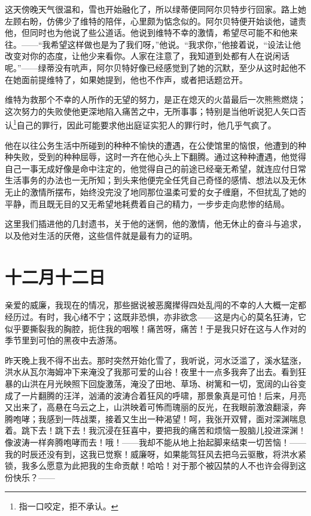 \documentclass[12pt,oneside]{book}
\begin{document}
\begin{framed}
这天傍晚天气很温和，雪也开始融化了，所以绿蒂便同阿尔贝特步行回家。路上她左顾右盼，仿佛少了维特的陪伴，心里颇为惦念似的。阿尔贝特便开始谈他，谴责他，但同时也为他说了些公道话。他说到维特不幸的激情，希望尽可能不和他来往。——“我希望这样做也是为了我们呀，”他说。“我求你，”他接着说，“设法让他改变对你的态度，让他少来看你。人家在注意了，我知道到处都有人在说闲话呢。”——绿蒂没有吭声，阿尔贝特好像已经感觉到了她的沉默，至少从这时起他不在她面前提维特了，如果她提到，他也不作声，或者把话题岔开。

维特为救那个不幸的人所作的无望的努力，是正在熄灭的火苗最后一次熊熊燃烧；这次努力的失败使他更深地陷入痛苦之中，无所事事；特别是当他听说犯人矢口否认\footnote{指一口咬定，拒不承认。}自己的罪行，因此可能要求他出庭证实犯人的罪行时，他几乎气疯了。

他在以往公务生活中所碰到的种种不愉快的遭遇，在公使馆里的恼恨，他遭到的种种失败，受到的种种屈辱，这时一齐在他心头上下翻腾。通过这种种遭遇，他觉得自己一事无成好像是命中注定的，他觉得自己的前途已经毫无希望，就连应付日常生活事务的办法也一无所知；到头来他便完全任凭自己奇怪的感情、想法以及无休无止的激情所摆布，始终没完没了地同那位温柔可爱的女子缠磨，不但扰乱了她的平静，而且既无目的又无希望地耗费着自己的精力，一步步走向悲惨的结局。

这里我们插进他的几封遗书，关于他的迷惘，他的激情，他无休止的奋斗与追求，以及他对生活的厌倦，这些信件就是最有力的证明。
　　
\end{framed}



\chapter{十二月十二日}
亲爱的威廉，我现在的情况，那些据说被恶魔撵得四处乱闯的不幸的人大概一定都经历过。有时，我心绪不宁；这既非恐惧，亦非欲念——这是内心的莫名狂涛，它似乎要撕裂我的胸腔，扼住我的咽喉！痛苦呀，痛苦！于是我只好在这与人作对的季节里到可怕的黑夜中去游荡。

昨天晚上我不得不出去。那时突然开始化雪了，我听说，河水泛滥了，溪水猛涨，洪水从瓦尔海姆冲下来淹没了我那可爱的山谷！夜里十一点多我奔了出去。看到狂暴的山洪在月光映照下回旋激荡，淹没了田地、草场、树篱和一切，宽阔的山谷变成了一片翻腾的汪洋，汹涌的波涛合着狂风的呼啸，那景象真是可怕！后来，月亮又出来了，高悬在乌云之上，山洪映着可怖而瑰丽的反光，在我眼前激浪翻滚，奔腾咆哮；我感到一阵战栗，接着又生出一种渴望！呵，我张开双臂，面对深渊喘息着。跳下去！跳下去！我沉浸在狂喜中，要把我的痛苦和烦恼一股脑儿投进深渊！像波涛一样奔腾咆哮而去！哦！——我却不能从地上抬起脚来结束一切苦恼！——我的时辰还没有到，这我已觉察！威廉呀，如果能驾狂风去把乌云驱散，将洪水紧锁，我多么愿意为此把我的生命贡献！哈哈！对于那个被囚禁的人不也许会得到这份快乐？——
\end{document}
